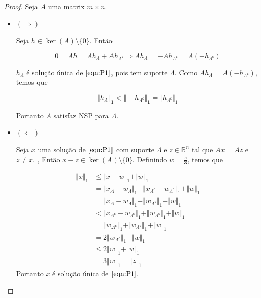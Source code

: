\begin{proof}
Seja $A$ uma matrix $m \times n$.
\begin{itemize}

\item $( \Rightarrow )$

Seja $h \in \ker(A) \setminus \lbrace 0 \rbrace$. Então

$$ 0 = Ah = Ah_{\Lambda} + Ah_{\Lambda^{\mathsf{c}}} \Rightarrow Ah_{\Lambda} = - Ah_{\Lambda^{\mathsf{c}}} = A( -h_{\Lambda^{\mathsf{c}}} )$$

$h_{\Lambda}$ é solução única de $\eqref{eqn:P1}$, pois tem suporte $\Lambda$. Como $Ah_{\Lambda} = A( -h_{\Lambda^{\mathsf{c}}} )$, temos que

$$ \Vert h_{\Lambda} \Vert_1 < \Vert - h_{\Lambda^{\mathsf{c}}} \Vert_1
= \Vert h_{\Lambda^{\mathsf{c}}} \Vert_1 $$

Portanto $A$ satisfaz NSP para $\Lambda$.

\item $( \Leftarrow )$

Seja $x$ uma solução de $\eqref{eqn:P1}$ com suporte $\Lambda$ e $z \in \mathbb{R}^n$ tal que $Ax = Az$ e $z \neq x$. , Então $x - z \in \ker(A) \setminus \lbrace 0 \rbrace$. Definindo $w = \frac{z}{3}$, temos que

\begin{subequations}
\begin{align*}
\Vert x \Vert_1
& \leq \Vert x - w \Vert_1 + \Vert w \Vert_1 \\
& =    \Vert x_{\Lambda} - w_{\Lambda} \Vert_1
	 + \Vert x_{\Lambda^{\mathsf{c}}} - w_{\Lambda^{\mathsf{c}}} \Vert_1
	 + \Vert w \Vert_1 \\
& =    \Vert x_{\Lambda} - w_{\Lambda} \Vert_1
	 + \Vert w_{\Lambda^{\mathsf{c}}} \Vert_1
	 + \Vert w \Vert_1 \\
& <    \Vert x_{\Lambda^{\mathsf{c}}} - w_{\Lambda^{\mathsf{c}}} \Vert_1
	 + \Vert w_{\Lambda^{\mathsf{c}}} \Vert_1
	 + \Vert w \Vert_1 \\
& =    \Vert w_{\Lambda^{\mathsf{c}}} \Vert_1
	 + \Vert w_{\Lambda^{\mathsf{c}}} \Vert_1
	 + \Vert w \Vert_1 \\
& = 2 \Vert w_{\Lambda^{\mathsf{c}}} \Vert_1 + \Vert w \Vert_1 \\
& \leq 2 \Vert w \Vert_1 + \Vert w \Vert_1 \\
& = 3 \Vert w \Vert_1 = \Vert z \Vert_1
\end{align*}
\end{subequations}
Portanto $x$ é solução única de $\eqref{eqn:P1}$.
\end{itemize}
\end{proof}


